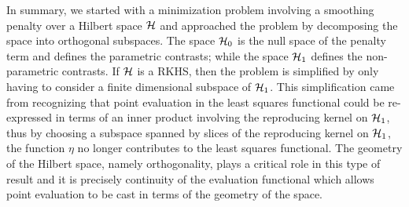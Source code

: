 In summary, we started with a minimization problem involving a smoothing penalty over a Hilbert space $\mathcal{H}$ and approached the problem by decomposing the space into orthogonal subspaces. The space $\mathcal{H}_0$ is the null space of the penalty term and defines the parametric contrasts; while the space $\mathcal{H}_1$ defines the non-parametric contrasts. If $\mathcal{H}$ is a RKHS, then the problem is simplified by only having to consider a finite dimensional subspace of $\mathcal{H}_1$. This simplification came from recognizing that point evaluation in the least squares functional could be re-expressed in terms of an inner product involving the reproducing kernel on $\mathcal{H}_1$, thus by choosing a subspace spanned by slices of the reproducing kernel on $\mathcal{H}_1$, the function $\eta$ no longer contributes to the least squares functional. The geometry of the Hilbert space, namely orthogonality, plays a critical role in this type of result and it is precisely continuity of the evaluation functional which allows point evaluation to be cast in terms of the geometry of the space.
%
%
%
%
%
%
